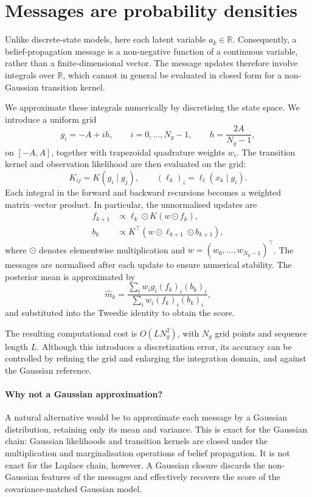 \section{Messages are probability densities}
\label{sec:grid}

Unlike discrete-state models, here each latent variable
$a_k\in\mathbb R$. Consequently, a belief-propagation message
is a non-negative function of a continuous variable, rather
than a finite-dimensional vector. The message updates therefore
involve integrals over $\mathbb R$, which cannot in general be
evaluated in closed form for a non-Gaussian transition kernel.

We approximate these integrals numerically by discretising the
state space. We introduce a uniform grid
\begin{equation}
    g_i=-A+ih,\qquad i=0,\ldots,N_g-1,
    \qquad h=\frac{2A}{N_g-1},
\end{equation}
on $[-A,A]$, together with trapezoidal quadrature weights
$w_i$. The transition kernel and observation likelihood are
then evaluated on the grid:
\begin{equation}
    K_{ij}=K(g_i\mid g_j),
    \qquad
    (\ell_k)_i=\ell_t(x_k\mid g_i).
\end{equation}
Each integral in the forward and backward recursions becomes
a weighted matrix--vector product. In particular, the
unnormalised updates are
\begin{align}
    f_{k+1}
    &\propto
    \ell_k\odot K(w\odot f_k),\\
    b_k
    &\propto
    K^\top(w\odot\ell_{k+1}\odot b_{k+1}),
\end{align}
where $\odot$ denotes elementwise multiplication and
$w=(w_0,\ldots,w_{N_g-1})^\top$.
The messages are normalised after each update to ensure
numerical stability. The posterior mean is approximated by
\begin{equation}
    \widehat m_k
    =
    \frac{\sum_i w_i g_i(f_k)_i(b_k)_i}
         {\sum_i w_i(f_k)_i(b_k)_i},
\end{equation}
and substituted into the Tweedie identity to obtain the score.

The resulting computational cost is
$O(LN_g^2)$, with $N_g$ grid points and sequence length $L$.
Although this introduces a discretization error, its
accuracy can be controlled by refining the grid and enlarging
the integration domain, and against the Gaussian reference.

\paragraph{Why not a Gaussian approximation?}
A natural alternative would be to approximate each message
by a Gaussian distribution, retaining only its mean and
variance. This is exact for the Gaussian chain: Gaussian
likelihoods and transition kernels are closed under the
multiplication and marginalisation operations of belief
propagation. It is not exact for the Laplace chain, however.
A Gaussian closure discards the non-Gaussian features of the
messages and effectively recovers the score of the
covariance-matched Gaussian model.

